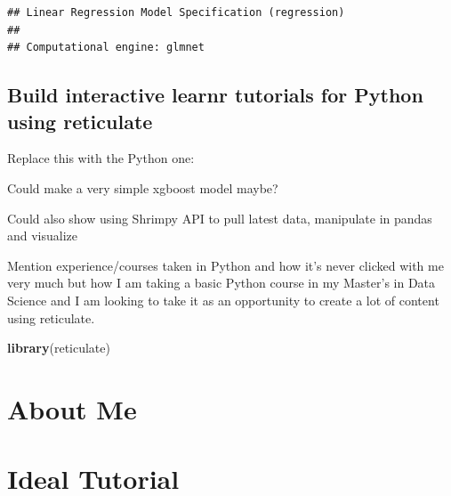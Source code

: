 \documentclass[
]{book}
\newenvironment{Shaded}{\begin{snugshade}}{\end{snugshade}}
\newcommand{\CommentTok}[1]{\textcolor[rgb]{0.56,0.35,0.01}{\textit{#1}}}
\newcommand{\KeywordTok}[1]{\textcolor[rgb]{0.13,0.29,0.53}{\textbf{#1}}}
\newcommand{\NormalTok}[1]{#1}
\newcommand{\OperatorTok}[1]{\textcolor[rgb]{0.81,0.36,0.00}{\textbf{#1}}}
\newcommand{\StringTok}[1]{\textcolor[rgb]{0.31,0.60,0.02}{#1}}
\begin{document}
\begin{verbatim}
## Linear Regression Model Specification (regression)
## 
## Computational engine: glmnet
\end{verbatim}

\begin{Shaded}
\end{Shaded}

\hypertarget{build-interactive-learnr-tutorials-for-python-using-reticulate}{%
\section{Build interactive learnr tutorials for Python using reticulate}\label{build-interactive-learnr-tutorials-for-python-using-reticulate}}

Replace this with the Python one:

Could make a very simple xgboost model maybe?

Could also show using Shrimpy API to pull latest data, manipulate in pandas and visualize

Mention experience/courses taken in Python and how it's never clicked with me very much but how I am taking a basic Python course in my Master's in Data Science and I am looking to take it as an opportunity to create a lot of content using reticulate.

\begin{Shaded}
\begin{Highlighting}[]
\KeywordTok{library}\NormalTok{(reticulate)}
\end{Highlighting}
\end{Shaded}

\hypertarget{about-me}{%
\chapter{About Me}\label{about-me}}

\hypertarget{ideal-tutorial}{%
\chapter{Ideal Tutorial}\label{ideal-tutorial}}
\end{document}
